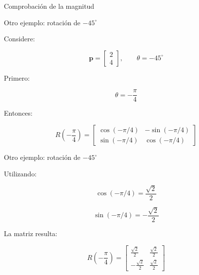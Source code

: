 \documentclass[aspectratio=169]{beamer}
\begin{document}
\begin{frame}{Comprobación de la magnitud}


    \vspace{0.3cm}


\end{frame}

\begin{frame}{Otro ejemplo: rotación de \texorpdfstring{$-45^\circ$}{-45 grados}}

    Considere:

    \[
    \mathbf{p}
    =
    \begin{bmatrix}
        2\\
        4
    \end{bmatrix},
    \qquad
    \theta=-45^\circ
    \]

    Primero:

    \[
    \theta
    =
    -\frac{\pi}{4}
    \]

    Entonces:

    \[
    R\left(-\frac{\pi}{4}\right)
    =
    \begin{bmatrix}
        \cos(-\pi/4) & -\sin(-\pi/4)\\
        \sin(-\pi/4) & \cos(-\pi/4)
    \end{bmatrix}
    \]

\end{frame}

\begin{frame}{Otro ejemplo: rotación de \texorpdfstring{$-45^\circ$}{-45 grados}}

    Utilizando:

    \[
    \cos(-\pi/4)=\frac{\sqrt{2}}{2}
    \]

    \[
    \sin(-\pi/4)=-\frac{\sqrt{2}}{2}
    \]

    La matriz resulta:

    \[
    R\left(-\frac{\pi}{4}\right)
    =
    \begin{bmatrix}
        \frac{\sqrt{2}}{2} & \frac{\sqrt{2}}{2}\\
        -\frac{\sqrt{2}}{2} & \frac{\sqrt{2}}{2}
    \end{bmatrix}
    \]

\end{frame}
\end{document}
